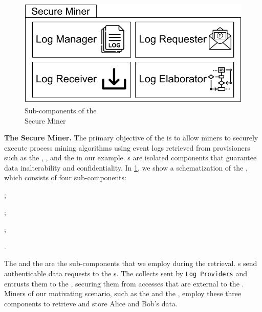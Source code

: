 \begin{figure}
	\centering
	\includegraphics[width=1\textwidth]{content/figures/secureminersad.pdf}
	\caption[Secure Miner sub-components]{Sub-components of the \\Secure Miner}
	\label{fig:trusted_miner}
	\vspace{-6pt}
\end{figure} 
\noindent\textbf{The Secure Miner.}
The primary objective of the  is to allow miners to securely execute process mining algorithms using event logs retrieved from provisioners such as the , , and the  in our example. s are isolated components that guarantee data inalterability and confidentiality. In \cref{fig:trusted_miner}, we show a schematization of the , which consists of four sub-components:
\begin{inparaenum}
    \item {};
    \item {};
    \item {}; 
    \item {}.
\end{inparaenum}
The  and the  are the sub-components that we employ during the  retrieval. s send authenticable data requests to the s. The  collects  sent by \texttt{Log Providers} and entrusts them to the , securing them from accesses that are external to the .
Miners of our motivating scenario, such as the  and the , employ these three components to retrieve and store Alice and Bob's data. %
